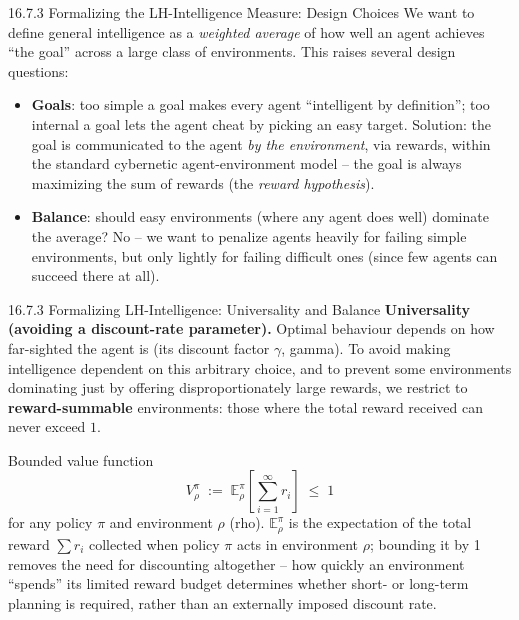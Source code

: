 \documentclass[aspectratio=169,10pt]{beamer}
\newcommand{\E}{\mathbb{E}}
\begin{document}
\begin{frame}{16.7.3 Formalizing the LH-Intelligence Measure: Design Choices}
  We want to define general intelligence as a \emph{weighted average} of
  how well an agent achieves ``the goal'' across a large class of
  environments. This raises several design questions:

  \begin{itemize}
    \item \textbf{Goals}: too simple a goal makes every agent ``intelligent
      by definition''; too internal a goal lets the agent cheat by picking
      an easy target. Solution: the goal is communicated to the agent
      \emph{by the environment}, via rewards, within the standard cybernetic
      agent-environment model -- the goal is always maximizing the sum of
      rewards (the \emph{reward hypothesis}).
    \item \textbf{Balance}: should easy environments (where any agent does
      well) dominate the average? No -- we want to penalize agents heavily
      for failing simple environments, but only lightly for failing
      difficult ones (since few agents can succeed there at all).
  \end{itemize}
\end{frame}

\begin{frame}{16.7.3 Formalizing LH-Intelligence: Universality and Balance}
  \textbf{Universality (avoiding a discount-rate parameter).} Optimal
  behaviour depends on how far-sighted the agent is (its discount factor
  $\gamma$, gamma). To avoid making intelligence dependent on this
  arbitrary choice, and to prevent some environments dominating just by
  offering disproportionately large rewards, we restrict to
  \textbf{reward-summable} environments: those where the total reward
  received can never exceed $1$.

  \begin{block}{Bounded value function}
    \[
      V^\pi_\rho \;:=\; \E^\pi_\rho\!\left[\sum_{i=1}^{\infty} r_i\right] \;\le\; 1
    \]
    for any policy $\pi$ and environment $\rho$ (rho). $\E^\pi_\rho$ is the
    expectation of the total reward $\sum r_i$ collected when policy $\pi$
    acts in environment $\rho$; bounding it by 1 removes the need for
    discounting altogether -- how quickly an environment ``spends'' its
    limited reward budget determines whether short- or long-term planning
    is required, rather than an externally imposed discount rate.
  \end{block}
\end{frame}
\end{document}
